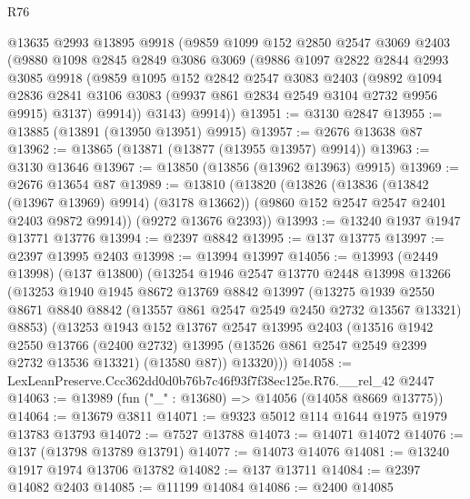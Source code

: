 \begin{lexlean}{R76}
\begin{coremodule}
      @13635
      @2993
      @13895
      @9918
      (@9859
        @1099
        @152
        @2850
        @2547
        @3069
        @2403
        (@9880
          @1098
          @2845
          @2849
          @3086
          @3069
          (@9886
            @1097
            @2822
            @2844
            @2993
            @3085
            @9918
            (@9859
              @1095
              @152
              @2842
              @2547
              @3083
              @2403
              (@9892
                @1094
                @2836
                @2841
                @3106
                @3083
                (@9937 @861 @2834 @2549 @3104 @2732 @9956 @9915)
                @3137)
              @9914))
          @3143)
        @9914))
@13951 := @3130 @2847
@13955 := @13885 (@13891 (@13950 @13951) @9915)
@13957 := @2676 @13638 @87
@13962 := @13865 (@13871 (@13877 (@13955 @13957) @9914))
@13963 := @3130 @13646
@13967 := @13850 (@13856 (@13962 @13963) @9915)
@13969 := @2676 @13654 @87
@13989 := @13810
    (@13820
      (@13826
        (@13836 (@13842 (@13967 @13969) @9914) (@3178 @13662))
        (@9860 @152 @2547 @2547 @2401 @2403 @9872 @9914))
      (@9272 @13676 @2393))
@13993 := @13240 @1937 @1947 @13771 @13776
@13994 := @2397 @8842
@13995 := @137 @13775
@13997 := @2397 @13995 @2403
@13998 := @13994 @13997
@14056 := @13993
    (@2449 @13998)
    (@137 @13800)
    (@13254
      @1946
      @2547
      @13770
      @2448
      @13998
      @13266
      (@13253
        @1940
        @1945
        @8672
        @13769
        @8842
        @13997
        (@13275
          @1939
          @2550
          @8671
          @8840
          @8842
          (@13557 @861 @2547 @2549 @2450 @2732 @13567 @13321)
          @8853)
        (@13253
          @1943
          @152
          @13767
          @2547
          @13995
          @2403
          (@13516
            @1942
            @2550
            @13766
            (@2400 @2732)
            @13995
            (@13526 @861 @2547 @2549 @2399 @2732 @13536 @13321)
            (@13580 @87))
          @13320)))
@14058 := LexLeanPreserve.Ccc362dd0d0b76b7c46f93f7f38ec125e.R76.__rel_42 @2447
@14063 := @13989 (fun ("_" : @13680) => @14056 (@14058 @8669 @13775))
@14064 := @13679 @3811
@14071 := @9323 @5012 @114 @1644 @1975 @1979 @13783 @13793
@14072 := @7527 @13788
@14073 := @14071 @14072
@14076 := @137 (@13798 @13789 @13791)
@14077 := @14073 @14076
@14081 := @13240 @1917 @1974 @13706 @13782
@14082 := @137 @13711
@14084 := @2397 @14082 @2403
@14085 := @11199 @14084
@14086 := @2400 @14085

\end{coremodule}
\end{lexlean}
